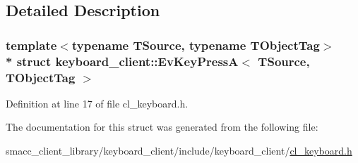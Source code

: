 \subsection{Detailed Description}
\subsubsection*{template$<$typename T\+Source, typename T\+Object\+Tag$>$\\*
struct keyboard\+\_\+client\+::\+Ev\+Key\+Press\+A$<$ T\+Source, T\+Object\+Tag $>$}



Definition at line 17 of file cl\+\_\+keyboard.\+h.



The documentation for this struct was generated from the following file\+:\begin{DoxyCompactItemize}
\item 
smacc\+\_\+client\+\_\+library/keyboard\+\_\+client/include/keyboard\+\_\+client/\hyperlink{cl__keyboard_8h}{cl\+\_\+keyboard.\+h}\end{DoxyCompactItemize}
